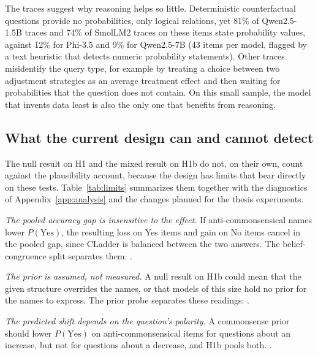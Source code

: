 The traces suggest why reasoning helps so little. Deterministic counterfactual questions provide no probabilities, only logical relations, yet 81\% of Qwen2.5-1.5B traces and 74\% of SmolLM2 traces on these items state probability values, against 12\% for Phi-3.5 and 9\% for Qwen2.5-7B (43 items per model, flagged by a text heuristic that detects numeric probability statements). Other traces misidentify the query type, for example by treating a choice between two adjustment strategies as an average treatment effect and then waiting for probabilities that the question does not contain. On this small sample, the model that invents data least is also the only one that benefits from reasoning.

\subsection{What the current design can and cannot detect}
\label{sec:res-limits}

The null result on H1 and the mixed result on H1b do not, on their own, count against the plausibility account, because the design has limits that bear directly on these tests. Table~\ref{tab:limits} summarizes them together with the diagnostics of Appendix~\ref{app:analysis} and the changes planned for the thesis experiments.

\emph{The pooled accuracy gap is insensitive to the effect.} If anti-commonsensical names lower $P(\text{Yes})$, the resulting loss on Yes items and gain on No items cancel in the pooled gap, since CLadder is balanced between the two answers. The belief-congruence split separates them: .

\emph{The prior is assumed, not measured.} A null result on H1b could mean that the given structure overrides the names, or that models of this size hold no prior for the names to express. The prior probe separates these readings: . 

\emph{The predicted shift depends on the question's polarity.} A commonsense prior should lower $P(\text{Yes})$ on anti-commonsensical items for questions about an increase, but not for questions about a decrease, and H1b pools both. .

